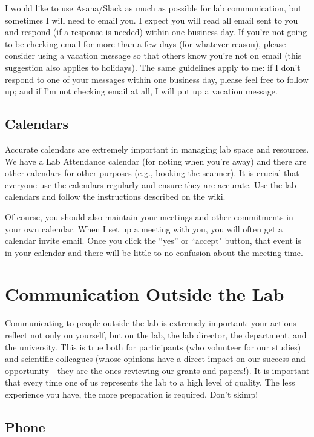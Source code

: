 \documentclass[letterpaper,11pt,oneside]{memoir}
\begin{document}
I would like to use Asana/Slack as much as possible for lab communication, but sometimes I will need to email you. I expect you will read all email sent to you and respond (if a response is needed) within one business day. If you're not going to be checking email for more than a few days (for whatever reason), please consider using a vacation message so that others know you're not on email (this suggestion also applies to holidays). The same guidelines apply to me: if I don't respond to one of your messages within one business day, please feel free to follow up; and if I'm not checking email at all, I will put up a vacation message. 


\subsection{Calendars}
Accurate calendars are extremely important in managing lab space and resources. We have a Lab Attendance calendar (for noting when you're away) and there are other calendars for other purposes (e.g., booking the scanner). It is crucial that everyone use the calendars regularly and ensure they are accurate. Use the lab calendars and follow the instructions described on the wiki.

Of course, you should also maintain your meetings and other commitments in your own calendar. When I set up a meeting with you, you will often get a calendar invite email. Once you click the ``yes'' or ``accept" button, that event is in your calendar and there will be little to no confusion about the meeting time. 




\section{Communication Outside the Lab}

Communicating to people outside the lab is extremely important: your actions reflect not only on yourself, but on the lab, the lab director, the department, and the university. This is true both for participants (who volunteer for our studies) and scientific colleagues (whose opinions have a direct impact on our success and opportunity---they are the ones reviewing our grants and papers!). It is important that every time one of us represents the lab to a high level of quality. The less experience you have, the more preparation is required. Don't skimp!

\subsection{Phone}
\end{document}
